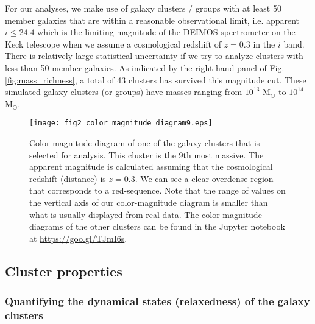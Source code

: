 For our analyses, we make use of galaxy clusters / groups 
with at least 50 member galaxies that are within a reasonable observational limit, 
i.e. apparent $i \leq 24.4$ which is the limiting magnitude of the DEIMOS
spectrometer on the Keck telescope when we assume a cosmological redshift of $z = 0.3$
in the $i$ band. %
There is relatively large statistical uncertainty if we try
to analyze clusters with less than 50 member galaxies. 
As indicated by the right-hand panel of Fig. \ref{fig:mass_richness}, 
a total of 43 clusters has 
survived this magnitude cut. These simulated galaxy clusters (or groups) have 
masses ranging from $10^{13}$ M$_\odot $ to $10^{14}$ M$_\odot$.  

\begin{figure}
	\centering
	\texttt{[image: fig2\_color\_magnitude\_diagram9.eps]}
	\caption{Color-magnitude diagram of one of the galaxy clusters that is selected for 
		analysis. This cluster is the 9th most massive. 
		The apparent magnitude is calculated assuming that 
		the cosmological redshift (distance) is $z = 0.3$. 
		We can see a clear overdense region that corresponds to a red-sequence.
		Note that the range of values on the vertical axis of our color-magnitude diagram is  
		smaller than what is usually displayed from real data.  
		The color-magnitude diagrams of the other clusters can be found in the
		Jupyter notebook at \href{https://github.com/karenyyng/galaxy_DM_offset/blob/master/code/analyses/fig2_color_magnitude_diagram.ipynb}{https://goo.gl/TJmI6s}.
		\label{fig:color_magnitude_diagram}
	} 
\end{figure}

\subsection{Cluster properties}
\label{subsec:cluster_properties}

\subsubsection{Quantifying the dynamical states (relaxedness) of the galaxy clusters}
\label{subsubsec:relaxedness}

